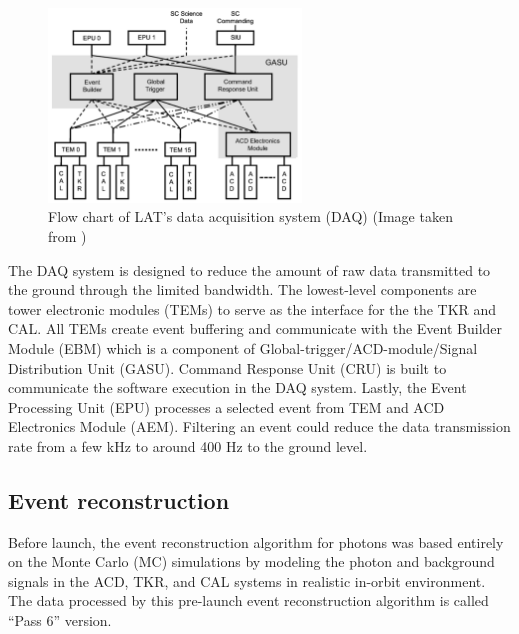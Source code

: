 \begin{figure}[h!]
    \centering
    \includegraphics[width=0.6\textwidth]{content/background/figures/fermi_daq.png}
    \caption{Flow chart of LAT's data acquisition system (DAQ) (Image taken from \citealt{FermiLAT})}
    \label{fig:fermi_daq}
\end{figure}

The DAQ system is designed to reduce the amount of raw data
transmitted to the ground through the limited bandwidth. 
The lowest-level components are tower electronic modules
(TEMs) to serve as the interface for the the TKR and CAL.
All TEMs create event 
buffering and communicate with the Event Builder Module (EBM) which is a
component of Global-trigger/ACD-module/Signal Distribution Unit (GASU).
Command Response Unit (CRU) is built to communicate the
software execution in the DAQ system. Lastly, the Event Processing Unit (EPU)
processes a selected event from TEM and ACD Electronics Module (AEM).
Filtering an event could reduce the data transmission rate from 
a few kHz to around 400 Hz to the ground level.


\subsection{Event reconstruction}

Before launch, the event reconstruction algorithm for photons
was based entirely on the Monte Carlo (MC) simulations by
modeling the photon and background signals in the ACD, TKR,
and CAL systems in realistic in-orbit environment.
The data processed by this pre-launch event reconstruction
algorithm is called ``Pass 6'' version.


